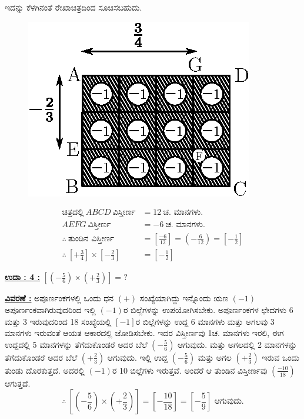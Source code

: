 ಇದನ್ನು ಕೆಳಗಿನಂತೆ ರೇಖಾಚಿತ್ರದಿಂದ ಸೂಚಿಸಬಹುದು. 
\begin{figure}[H]
\centering
\includegraphics[scale=0.8]{src/figure/chap3/fig3-25b.eps}
\end{figure}
\begin{align*}
\text{ಚಿತ್ರದಲ್ಲಿ}~ ABCD ~\text{ವಿಸ್ತೀರ್ಣ} & = 12~ \text{ಚ. ಮಾನಗಳು.}\\
AEFG~ \text{ವಿಸ್ತೀರ್ಣ} & = -6~ \text{ಚ. ಮಾನಗಳು.}\\
\therefore~ \text{ತುಂಡಿನ ವಿಸ್ತೀರ್ಣ} &  = \left[\frac{-6}{12}\right] = \left(-\frac{6}{12} \right)=\left[-\frac{1}{2}\right]\\
\therefore~ \left[+ \frac{3}{4}\right] \times \left[-\frac{2}{3}\right] & = \left[- \frac{1}{2}\right]
\end{align*}

\noindent
{\textbf{\underline{ಉದಾ : 4 :}}} $\left[\left(-\frac{5}{6}\right) \times \left(+\frac{2}{3}\right) \right] = ?$

\noindent
{\textbf{\underline{ವಿವರಣೆ :}}} ಅಪೂರ್ಣಂಕಗಳಲ್ಲಿ ಒಂದು ಧನ $(+)$ ಸಂಖ್ಯೆಯಾಗಿದ್ದು ಇನ್ನೊಂದು ಋಣ $(-1)$ ಅಪೂರ್ಣಂಕವಾಗಿರುವುದರಿಂದ ಇಲ್ಲಿ $(-1)$ರ ಬಿಲ್ಲೆಗಳನ್ನು ಉಪಯೋಗಿಸಬೇಕು. ಅಪೂರ್ಣಂಕಗಳ ಛೇದಗಳು 6 ಮತ್ತು 3 ಇರುವುದರಿಂದ 18 ಸಂಖ್ಯೆಯಲ್ಲಿ $[-1]$ರ ಬಿಲ್ಲೆಗಳನ್ನು ಉದ್ದ 6 ಮಾನಗಳು ಮತ್ತು ಅಗಲವು 3 ಮಾನಗಳು ಇರುವಂತೆ ಆಯತ ಆಕಾರದಲ್ಲಿ ಜೋಡಿಸಬೇಕು. ಇದರ ವಿಸ್ತೀರ್ಣವು 1ಚ. ಮಾನಗಳು ಇರಲಿ, ಈಗ ಉದ್ದದಲ್ಲಿ 5 ಮಾನಗಳನ್ನು ತೆಗೆದುಕೊಂಡರೆ ಅದರ ಬೆಲೆ $\left(-\frac{5}{6} \right)$ ಆಗುವುದು. ಮತ್ತು ಅಗಲದಲ್ಲಿ 2 ಮಾನಗಳನ್ನು ತೆಗೆದುಕೊಂಡರೆ ಅದರ ಬೆಲೆ $\left(+\frac{2}{3}\right)$ ಆಗುವುದು. ಇಲ್ಲಿ ಉದ್ದ $\left(-\frac{5}{6}\right)$ ಮತ್ತು ಅಗಲ $\left(+\frac{2}{3} \right)$ ಇರುವ ಒಂದು ತುಂಡು ದೊರಕುತ್ತದೆ. ಅದರಲ್ಲಿ $(-1)$ರ 10 ಬಿಲ್ಲೆಗಳು ಇರುತ್ತವೆ. ಅಂದರೆ ಆ ತುಂಡಿನ ವಿಸ್ತೀರ್ಣವು $\left(\frac{-10}{18}\right)$ ಆಗುತ್ತದೆ.
$$
\therefore~ \left[\left(-\frac{5}{6}\right) \times \left(+ \frac{2}{3}\right) \right] = \left[-\frac{10}{18}\right]=\left[-\frac{5}{9}\right] \text{ ಆಗುವುದು.}
$$

